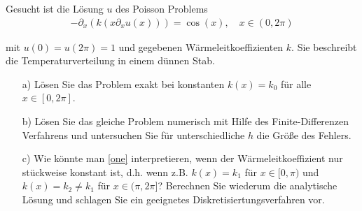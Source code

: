 \begin{exercise}
  Gesucht ist die Lösung $u$ des Poisson Problems
  \begin{align}\label{one}
    -\partial_x (k(x \partial_x u(x)))
    =
    \cos(x),
    \quad
    x \in (0,2\pi)
  \end{align}

  mit $u(0) = u(2\pi) = 1$ und gegebenen Wärmeleitkoeffizienten $k$. Sie
  beschreibt die Temperaturverteilung in einem dünnen Stab.

  \begin{itemize}
  \item[a)] Lösen Sie das Problem exakt bei konstanten $k(x) = k_0$ für alle
  $x \in [0, 2\pi]$.

  \item[b)] Lösen Sie das gleiche Problem numerisch mit Hilfe des Finite-Differenzen
  Verfahrens und untersuchen Sie für unterschiedliche $h$ die Größe des Fehlers.

  \item[c)] Wie könnte man \eqref{one} interpretieren, wenn der Wärmeleitkoeffizient
  nur stückweise konstant ist, d.h. wenn z.B. $k(x) = k_1$ für $x \in [0, \pi)$ und
  $k(x) = k_2 \neq k_1$ für $x \in (\pi, 2\pi]$? Berechnen Sie wiederum die analytische
  Lösung und schlagen Sie ein geeignetes Diskretisiertungsverfahren vor.
  \end{itemize}
\end{exercise}

